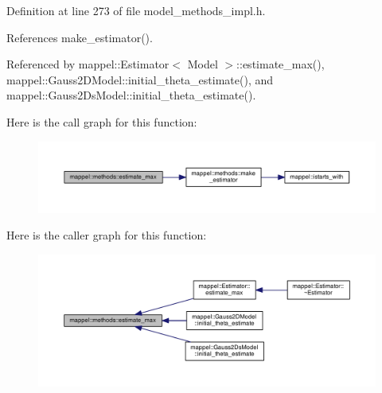 Definition at line 273 of file model\+\_\+methods\+\_\+impl.\+h.



References make\+\_\+estimator().



Referenced by mappel\+::\+Estimator$<$ Model $>$\+::estimate\+\_\+max(), mappel\+::\+Gauss2\+D\+Model\+::initial\+\_\+theta\+\_\+estimate(), and mappel\+::\+Gauss2\+Ds\+Model\+::initial\+\_\+theta\+\_\+estimate().



Here is the call graph for this function\+:\nopagebreak
\begin{figure}[H]
\begin{center}
\leavevmode
\includegraphics[width=350pt]{namespacemappel_1_1methods_a7f4a5561497c243edaa6f55fddf0ec4e_cgraph}
\end{center}
\end{figure}




Here is the caller graph for this function\+:\nopagebreak
\begin{figure}[H]
\begin{center}
\leavevmode
\includegraphics[width=350pt]{namespacemappel_1_1methods_a7f4a5561497c243edaa6f55fddf0ec4e_icgraph}
\end{center}
\end{figure}


